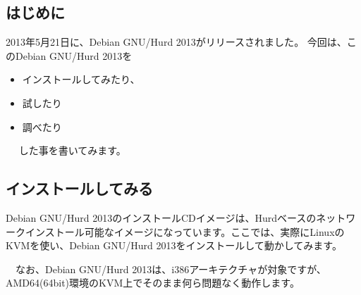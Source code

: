 \documentclass[mingoth,a4paper]{jsarticle}
\begin{document}
\subsection{はじめに}

 2013年5月21日に、Debian GNU/Hurd 2013がリリースされました\cite{news-release-hurd}。
 今回は、このDebian GNU/Hurd 2013を
\begin{itemize}
\item インストールしてみたり、
\item 試したり
\item 調べたり
\end{itemize}　
した事を書いてみます。

\subsection{インストールしてみる}

 Debian GNU/Hurd 2013のインストールCDイメージは、Hurdベースのネットワークインストール可能なイメージになっています。ここでは、実際にLinuxのKVMを使い、Debian GNU/Hurd 2013をインストールして動かしてみます。

　なお、Debian GNU/Hurd 2013は、i386アーキテクチャが対象ですが、AMD64(64bit)環境のKVM上でそのまま何ら問題なく動作します。
\end{document}
